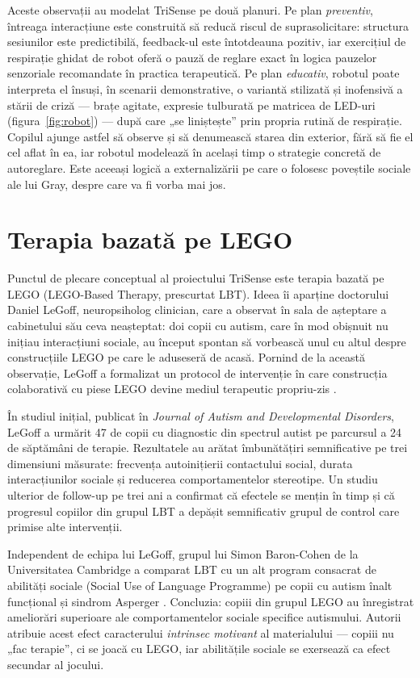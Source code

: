 Aceste observații au modelat TriSense pe două planuri. Pe plan \emph{preventiv}, întreaga interacțiune este construită să reducă riscul de suprasolicitare: structura sesiunilor este predictibilă, feedback-ul este întotdeauna pozitiv, iar exercițiul de respirație ghidat de robot oferă o pauză de reglare exact în logica pauzelor senzoriale recomandate în practica terapeutică. Pe plan \emph{educativ}, robotul poate interpreta el însuși, în scenarii demonstrative, o variantă stilizată și inofensivă a stării de criză — brațe agitate, expresie tulburată pe matricea de LED-uri (figura~\ref{fig:robot}) — după care „se liniștește” prin propria rutină de respirație. Copilul ajunge astfel să observe și să denumească starea din exterior, fără să fie el cel aflat în ea, iar robotul modelează în același timp o strategie concretă de autoreglare. Este aceeași logică a externalizării pe care o folosesc poveștile sociale ale lui Gray, despre care va fi vorba mai jos.

\section{Terapia bazată pe LEGO}

Punctul de plecare conceptual al proiectului TriSense este terapia bazată pe LEGO (LEGO-Based Therapy, prescurtat LBT). Ideea îi aparține doctorului Daniel LeGoff, neuropsiholog clinician, care a observat în sala de așteptare a cabinetului său ceva neașteptat: doi copii cu autism, care în mod obișnuit nu inițiau interacțiuni sociale, au început spontan să vorbească unul cu altul despre construcțiile LEGO pe care le aduseseră de acasă. Pornind de la această observație, LeGoff a formalizat un protocol de intervenție în care construcția colaborativă cu piese LEGO devine mediul terapeutic propriu-zis \cite{legoff2004}.

În studiul inițial, publicat în \emph{Journal of Autism and Developmental Disorders}, LeGoff a urmărit 47 de copii cu diagnostic din spectrul autist pe parcursul a 24 de săptămâni de terapie. Rezultatele au arătat îmbunătățiri semnificative pe trei dimensiuni măsurate: frecvența autoinițierii contactului social, durata interacțiunilor sociale și reducerea comportamentelor stereotipe. Un studiu ulterior de follow-up pe trei ani \cite{legoff2006} a confirmat că efectele se mențin în timp și că progresul copiilor din grupul LBT a depășit semnificativ grupul de control care primise alte intervenții.

Independent de echipa lui LeGoff, grupul lui Simon Baron-Cohen de la Universitatea Cambridge a comparat LBT cu un alt program consacrat de abilități sociale (Social Use of Language Programme) pe copii cu autism înalt funcțional și sindrom Asperger \cite{owens2008}. Concluzia: copiii din grupul LEGO au înregistrat ameliorări superioare ale comportamentelor sociale specifice autismului. Autorii atribuie acest efect caracterului \emph{intrinsec motivant} al materialului — copiii nu „fac terapie”, ci se joacă cu LEGO, iar abilitățile sociale se exersează ca efect secundar al jocului.

